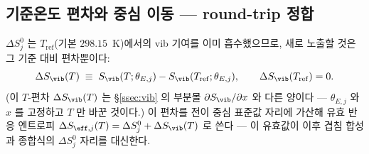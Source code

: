 \subsection{기준온도 편차와 중심 이동 --- round-trip 정합}\label{ssec:einstein-roundtrip}
$\Delta S^0_j$ 는 $T_\mathrm{ref}$(기본 $298.15$~K)에서의 vib 기여를 이미 흡수했으므로, 새로 노출할 것은 그
기준 대비 편차뿐이다:
\begin{equation}
\Delta S_\vib(T) \;\equiv\; S_\vib(T;\theta_{E,j})-S_\vib(T_\mathrm{ref};\theta_{E,j}),
\qquad \Delta S_\vib(T_\mathrm{ref})=0.
\label{eq:dSvib}
\end{equation}
(이 $T$-편차 $\Delta S_\vib(T)$ 는 \S\ref{ssec:vib} 의 부분몰 $\partial S_\vib/\partial x$ 와 다른 양이다 ---
$\theta_{E,j}$ 와 $x$ 를 고정하고 $T$ 만 바꾼 것이다.) 이 편차를 전이 중심 표준값 자리에 가산해 유효 반응
엔트로피 $\Delta S_{\eff,j}(T)=\Delta S^0_j+\Delta S_\vib(T)$ 로 쓴다 --- 이 유효값이 이후 겹침 합성과
종합식의 $\Delta S^0_j$ 자리를 대신한다.

